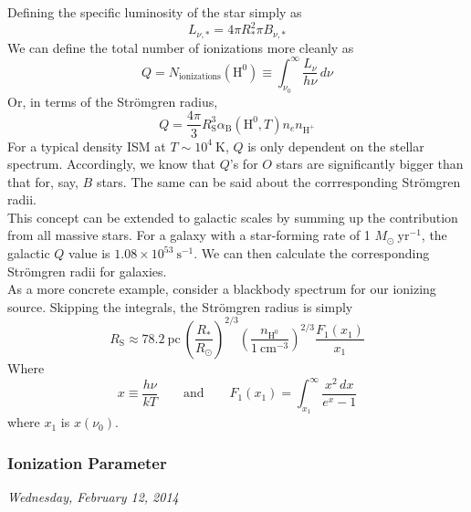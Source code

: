 \documentclass[10pt]{article}
\numberwithin{equation}{section}
\newcommand{\n}{\noindent}
\begin{document}
\n Defining the specific luminosity of the star simply as
\begin{equation}
  \label{eq:strom:17} L_{\nu, *} = 4\pi R_*^2 \pi B_{\nu, *}
\end{equation}
We can define the total number of ionizations more cleanly as 
\begin{equation}
  \label{eq:strom:18} Q = N_{\mathrm{ionizations}}(\mathrm{H^0}) \equiv 
  \int_{\nu_0}^\infty \frac{L_\nu}{h\nu}\,d\nu
\end{equation}
Or, in terms of the Str\"omgren radius,
\begin{equation}
  \label{eq:strom:19} \boxed{Q = \frac{4\pi}{3}R_{\mathrm{S}}^3
  \alpha_{\mathrm{B}}(\mathrm{H^0},T)n_en_{\mathrm{H^+}}}
\end{equation}
For a typical density ISM at $T\sim 10^4\ \mathrm{K}$, $Q$ is only dependent
on the stellar spectrum. Accordingly, we know that $Q$'s for $O$ stars are
significantly bigger than that for, say, $B$ stars. The same can be said about
the corrresponding Str\"omgren radii.\\

\n This concept can be extended to galactic scales by summing up the
contribution from all massive stars. For a galaxy with a star-forming rate of 1
$M_\odot\ \mathrm{yr}^{-1}$, the galactic $Q$ value is $1.08\times 10^{53}\
\mathrm{s^{-1}}$. We can then calculate the corresponding Str\"omgren radii for
galaxies.\\

\n As a more concrete example, consider a blackbody spectrum for our ionizing
source. Skipping the integrals, the Str\"omgren radius is simply
\begin{equation}
  \label{eq:strom:20} R_{\mathrm{S}} \approx 78.2\ \mathrm{pc}\
  \left(\frac{R_*}{R_\odot}\right)^{2/3} \left(\frac{n_{\mathrm{H^0}}}{1\
  \mathrm{cm^{-3}}}\right)^{2/3} \frac{F_1(x_1)}{x_1}
\end{equation}
Where
\begin{equation}
  \label{eq:strom:21} x \equiv \frac{h\nu}{kT} \qquad \textrm{and} \qquad
  F_1(x_1) = \int_{x_1}^\infty \frac{x^2\,dx}{e^x-1}
\end{equation}
where $x_1$ is $x(\nu_0)$.

\subsubsection{Ionization Parameter} %
\label{ssub:ionization_parameter}
\textit{Wednesday, February 12, 2014}\\
\end{document}
